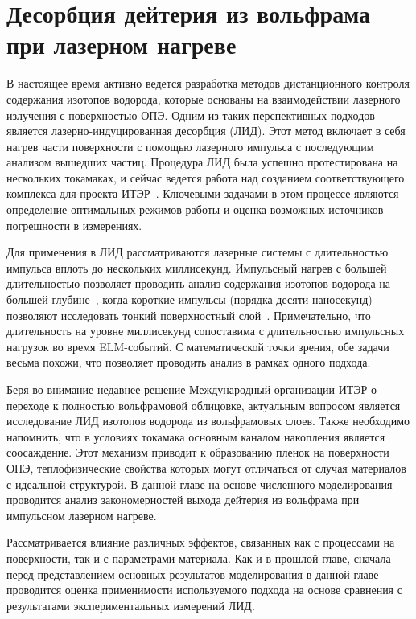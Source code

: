 \chapter{Десорбция дейтерия из вольфрама при лазерном нагреве}\label{ch:ch4}

В настоящее время активно ведется разработка методов дистанционного контроля содержания изотопов водорода, которые основаны на взаимодействии лазерного излучения с поверхностью ОПЭ. Одним из таких перспективных подходов является лазерно-индуцированная десорбция (ЛИД). Этот метод включает в себя нагрев части поверхности с помощью лазерного импульса с последующим анализом вышедших частиц. Процедура ЛИД была успешно протестирована на нескольких токамаках, и сейчас ведется работа над созданием соответствующего комплекса для проекта ИТЭР~\cite{Zlobinski2024}. Ключевыми задачами в этом процессе являются определение оптимальных режимов работы и оценка возможных источников погрешности в измерениях.

Для применения в ЛИД рассматриваются лазерные системы с длительностью импульса вплоть до нескольких миллисекунд. Импульсный нагрев с большей длительностью позволяет проводить анализ содержания изотопов водорода на большей глубине~\cite{Yu2019, Zlobinski2020}, когда короткие импульсы (порядка десяти наносекунд) позволяют исследовать тонкий поверхностный слой~\cite{Gasparyan2021}. Примечательно, что длительность на уровне миллисекунд сопоставима с длительностью импульсных нагрузок во время ELM-событий. С математической точки зрения, обе задачи весьма похожи, что позволяет проводить анализ в рамках одного подхода.

Беря во внимание недавнее решение Международный организации ИТЭР о переходе к полностью вольфрамовой облицовке, актуальным вопросом является исследование ЛИД изотопов водорода из вольфрамовых слоев. Также необходимо напомнить, что в условиях токамака основным каналом накопления является соосаждение. Этот механизм приводит к образованию пленок на поверхности ОПЭ, теплофизические свойства которых могут отличаться от случая материалов с идеальной структурой. В данной главе на основе численного моделирования проводится анализ закономерностей выхода дейтерия из вольфрама при импульсном лазерном нагреве.

Рассматривается влияние различных эффектов, связанных как с процессами на поверхности, так и с параметрами материала. Как и в прошлой главе, сначала перед представлением основных результатов моделирования в данной главе проводится оценка применимости используемого подхода на основе сравнения с результатами экспериментальных измерений ЛИД. 

